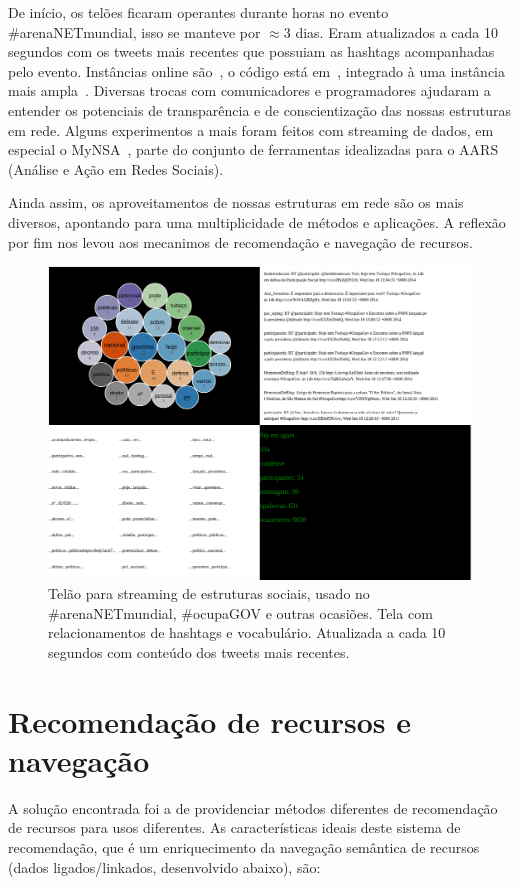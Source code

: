 \documentclass[a4paper, 11pt]{article} %
\begin{document}
De início, os telões ficaram operantes durante horas no evento \#arenaNETmundial, isso se manteve por $\approx 3$ dias. Eram atualizados a cada 10 segundos com os tweets mais recentes que possuiam as hashtags acompanhadas pelo evento. Instâncias online são~\cite{ocupagov,mmissa,mmissa2}, o código está em~\cite{codTelao}, integrado à uma instância mais ampla~\cite{mmissa2}. Diversas trocas com comunicadores e programadores ajudaram a entender os potenciais de transparência e de conscientização das nossas estruturas em rede. Alguns experimentos a mais foram feitos com streaming de dados, em especial o MyNSA~\cite{mynsa}, parte do conjunto de ferramentas idealizadas para o AARS (Análise e Ação em Redes Sociais).

Ainda assim, os aproveitamentos de nossas estruturas em rede são os mais diversos, apontando para uma multiplicidade de métodos e aplicações. A reflexão por fim nos levou aos mecanimos de recomendação e navegação de recursos.
\begin{figure}[H]
  \centering
    \includegraphics[width=.7\textwidth]{telao2.png}
  \caption{\small Telão para streaming de estruturas sociais, usado no \#arenaNETmundial, \#ocupaGOV e outras ocasiões. Tela com relacionamentos de hashtags e vocabulário. Atualizada a cada 10 segundos com conteúdo dos tweets mais recentes.}\label{fig:telao2}
\end{figure}


\section*{Recomendação de recursos e navegação}
A solução encontrada foi a de providenciar métodos diferentes de recomendação de recursos para usos diferentes. As características ideais deste sistema de recomendação, que é um enriquecimento da navegação semântica de recursos (dados ligados/linkados, desenvolvido abaixo), são:
\end{document}
